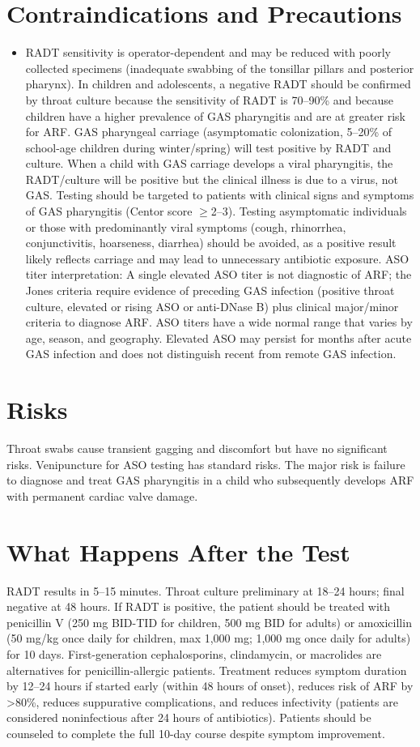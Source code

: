 \section*{Contraindications and Precautions}
\begin{itemize}
  \item RADT sensitivity is operator-dependent and may be reduced with poorly collected specimens (inadequate swabbing of the tonsillar pillars and posterior pharynx). In children and adolescents, a negative RADT should be confirmed by throat culture because the sensitivity of RADT is 70--90\% and because children have a higher prevalence of GAS pharyngitis and are at greater risk for ARF. GAS pharyngeal carriage (asymptomatic colonization, 5--20\% of school-age children during winter/spring) will test positive by RADT and culture. When a child with GAS carriage develops a viral pharyngitis, the RADT/culture will be positive but the clinical illness is due to a virus, not GAS. Testing should be targeted to patients with clinical signs and symptoms of GAS pharyngitis (Centor score $\geq$2--3). Testing asymptomatic individuals or those with predominantly viral symptoms (cough, rhinorrhea, conjunctivitis, hoarseness, diarrhea) should be avoided, as a positive result likely reflects carriage and may lead to unnecessary antibiotic exposure. ASO titer interpretation: A single elevated ASO titer is not diagnostic of ARF; the Jones criteria require evidence of preceding GAS infection (positive throat culture, elevated or rising ASO or anti-DNase B) plus clinical major/minor criteria to diagnose ARF. ASO titers have a wide normal range that varies by age, season, and geography. Elevated ASO may persist for months after acute GAS infection and does not distinguish recent from remote GAS infection.
\end{itemize}
\section*{Risks}
Throat swabs cause transient gagging and discomfort but have no significant risks. Venipuncture for ASO testing has standard risks. The major risk is failure to diagnose and treat GAS pharyngitis in a child who subsequently develops ARF with permanent cardiac valve damage.

\section*{What Happens After the Test}
RADT results in 5--15 minutes. Throat culture preliminary at 18--24 hours; final negative at 48 hours. If RADT is positive, the patient should be treated with penicillin V (250 mg BID-TID for children, 500 mg BID for adults) or amoxicillin (50 mg/kg once daily for children, max 1,000 mg; 1,000 mg once daily for adults) for 10 days. First-generation cephalosporins, clindamycin, or macrolides are alternatives for penicillin-allergic patients. Treatment reduces symptom duration by 12--24 hours if started early (within 48 hours of onset), reduces risk of ARF by >80\%, reduces suppurative complications, and reduces infectivity (patients are considered noninfectious after 24 hours of antibiotics). Patients should be counseled to complete the full 10-day course despite symptom improvement.

